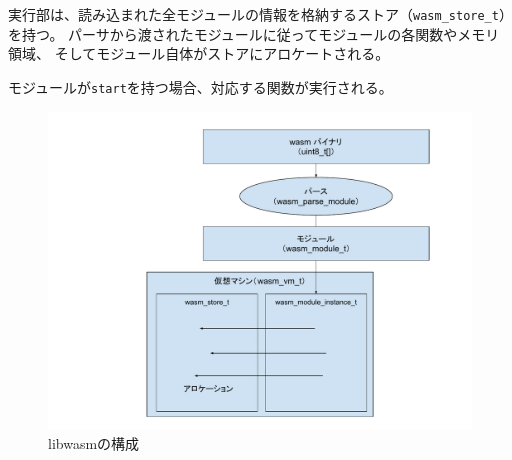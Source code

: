 実行部は、読み込まれた全モジュールの情報を格納するストア（\verb|wasm_store_t|）を持つ。
パーサから渡されたモジュールに従ってモジュールの各関数やメモリ領域、
そしてモジュール自体がストアにアロケートされる。

モジュールが\verb|start|を持つ場合、対応する関数が実行される。

\begin{figure}[htbp]
  \caption{libwasmの構成}
  \label{fig:libwasm_arch}
  \begin{center}
    \includegraphics[bb=0 0 800 600,width=12cm]{img/libwasm_arch.pdf}
  \end{center}
\end{figure}
